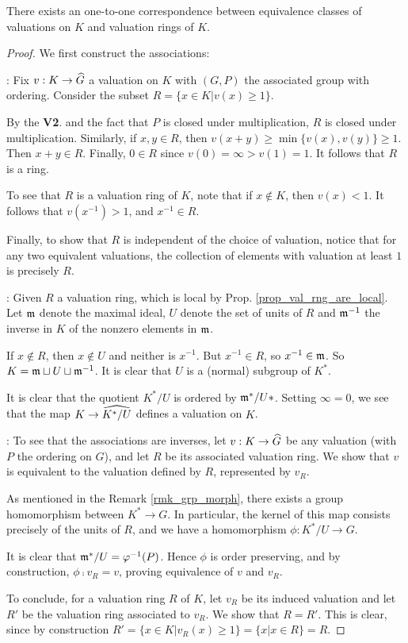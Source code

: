 \begin{thm}\label{thm_valrng_eq_val}
There exists an one-to-one correspondence between equivalence 
classes of valuations on $K$ and valuation rings of $K$.
\end{thm}
\begin{proof}
We first construct the associations:

: Fix $v: K \to 
\widehat{G}$ a valuation on $K$ with $(G, P)$ the associated group 
with ordering. Consider the subset $R = \{x \in K | v(x) \geq 
1\}$. 

By the \textbf{V2}. and the fact that $P$ is closed under 
multiplication, $R$ is closed under multiplication. Similarly,
if $x, y \in R$, then $v(x + y) \geq \min\{v(x), v(y)\} \geq 1.$
Then $x + y \in R$. Finally, $0 \in R$ since $v(0) = \infty > 
v(1) = 1$. It follows that $R$ is a ring.

To see that $R$ is a valuation ring of $K$, note that if $x 
\notin K$, then $v(x) < 1$. It follows that $v(x^{-1}) > 1$, and 
$x^{-1} \in R$.

Finally, to show that $R$ is independent of the choice of valuation,
notice that for any two equivalent valuations, the collection of
elements with valuation at least $1$ is precisely $R$.

: Given $R$
a valuation ring, which is local by Prop. 
\ref{prop_val_rng_are_local}. Let $\mathfrak{m}$ denote the maximal
ideal, $U$ denote the set of units of $R$ and $\mathfrak{m}^{-1}$
the inverse in $K$ of the nonzero elements in $\mathfrak{m}$. 

If $x \notin R$, then $x \notin U$ and neither is $x^{-1}$. But 
$x^{-1} \in R$, so $x^{-1} \in \mathfrak{m}$. So $K = \mathfrak{m} \sqcup
U \sqcup \mathfrak{m}^{-1}$. It is clear that $U$ is a (normal) subgroup
of $K^*$. 

It is clear that the quotient $K^*/U$ is ordered by 
$\mathfrak{m}^{*}/U*$. Setting $\infty = 0$, we see that the map $K 
\to \widehat{K^*/U}$ defines a valuation on $K$.

: To see that the associations are inverses, 
let $v: K \to \widehat{G}$ be any valuation (with $P$ the ordering on 
$G$), and let $R$ be its associated valuation ring. We show that
$v$ is equivalent to the valuation defined by $R$, represented
by $v_R$.

As mentioned in the Remark \ref{rmk_grp_morph}, there exists a 
group homomorphism between $K^* \to G$. In particular, the 
kernel of this map consists precisely of the units of $R$, and we
have a homomorphism $\phi: K^*/U \to G$.

It is clear that $\mathfrak{m}^*/U = \varphi^{-1}(P)$. Hence $\phi$ is
order preserving, and by construction, $\phi \comp v_R = v$, 
proving equivalence of $v$ and $v_R$.

To conclude, for a valuation ring $R$ of $K$, let $v_R$ be its
induced valuation and let $R'$ be the valuation ring associated to
$v_R$. We show that $R = R'$. This is clear, since by construction
$R' = \{x \in K | v_R(x) \geq 1\} = \{x | x \in R\} = R.$

\end{proof}
